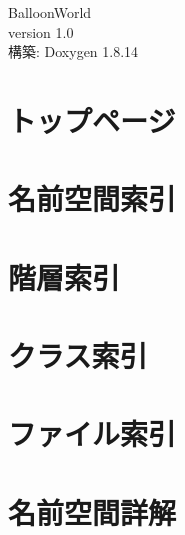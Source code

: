 \documentclass[twoside]{book}
\newcommand{\+}{\discretionary{\mbox{\scriptsize$\hookleftarrow$}}{}{}}
\newcommand{\clearemptydoublepage}{%
  \newpage{\pagestyle{empty}\cleardoublepage}%
}
\begin{document}
\hypersetup{pageanchor=false,
             bookmarksnumbered=true,
             pdfencoding=unicode
            }
\begin{titlepage}
\vspace*{7cm}
\begin{center}%
{\Large Balloon\+World \\[1ex]\large version 1.\+0 }\\
\vspace*{1cm}
{\large 構築\+: Doxygen 1.8.14}\\
\end{center}
\end{titlepage}
\clearemptydoublepage
{}
\tableofcontents
\clearemptydoublepage
{}
\hypersetup{pageanchor=true}

\chapter{トップページ}
\label{index}\hypertarget{index}{}
\chapter{名前空間索引}

\chapter{階層索引}

\chapter{クラス索引}

\chapter{ファイル索引}

\chapter{名前空間詳解}






\end{document}
